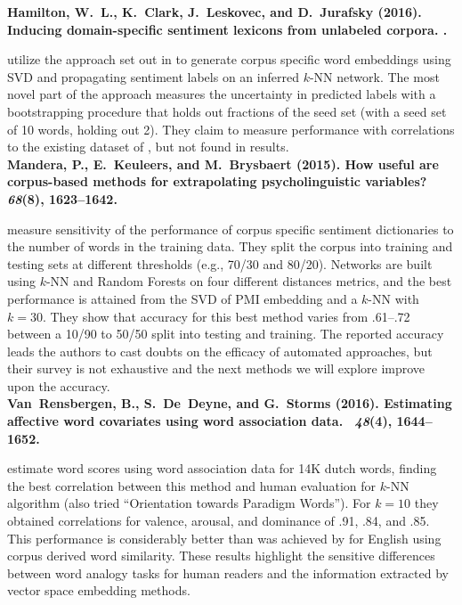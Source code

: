 {\noindent \textbf{Hamilton, W.~L., K.~Clark, J.~Leskovec, and D.~Jurafsky (2016).
\newblock Inducing domain-specific sentiment lexicons from unlabeled corpora.
.}

\noindent \cite{hamilton2016inducing} utilize the approach set out in \cite{velikovich2010viability} to generate corpus specific word embeddings using SVD and propagating sentiment labels on an inferred $k$-NN network.
The most novel part of the approach measures the uncertainty in predicted labels with a bootstrapping procedure that holds out fractions of the seed set (with a seed set of 10 words, holding out 2).
They claim to measure performance with correlations to the existing dataset of \cite{warriner2013norms}, but not found in results.\\

\noindent \textbf{Mandera, P., E.~Keuleers, and M.~Brysbaert (2015).
\newblock How useful are corpus-based methods for extrapolating psycholinguistic variables?
~{\em
  68\/}(8), 1623--1642.}

\noindent \cite{mandera2015useful} measure sensitivity of the performance of corpus specific sentiment dictionaries to the number of words in the training data.
They split the \cite{warriner2013norms} corpus into training and testing sets at different thresholds (e.g., 70/30 and 80/20).
Networks are built using $k$-NN and Random Forests on four different distances metrics, and the best performance is attained from the SVD of PMI embedding and a $k$-NN with $k=30$.
They show that accuracy for this best method varies from .61--.72 between a 10/90 to 50/50 split into testing and training.
The reported accuracy leads the authors to cast doubts on the efficacy of automated approaches, but their survey is not exhaustive and the next methods we will explore improve upon the accuracy.\\

\noindent \textbf{Van~Rensbergen, B., S.~De~Deyne, and G.~Storms (2016).
\newblock Estimating affective word covariates using word association data.
~{\em 48\/}(4), 1644--1652.}

\noindent \cite{van2016estimating} estimate word scores using word association data for 14K dutch words, finding the best correlation between this method and human evaluation for $k$-NN algorithm (also tried ``Orientation towards Paradigm Words'').
For $k=10$ they obtained correlations for valence, arousal, and dominance of .91, .84, and .85.
This performance is considerably better than was achieved by \cite{mandera2015useful} for English using corpus derived word similarity.
These results highlight the sensitive differences between word analogy tasks for human readers and the information extracted by vector space embedding methods.\\

}
